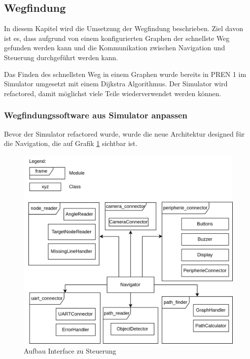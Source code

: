 \subsection{Wegfindung}

In diesem Kapitel wird die Umsetzung der Wegfindung beschrieben. Ziel davon ist es, dass aufgrund von einem konfigurierten Graphen der schnellste Weg gefunden werden kann und die Kommunikation zwischen Navigation und Steuerung durchgeführt werden kann.

Das Finden des schnellsten Weg in einem Graphen wurde bereits in PREN 1 im Simulator umgesetzt mit einem Dijkstra Algorithmus. Der Simulator wird refactored, damit möglichst viele Teile wiederverwendet werden können.

\subsubsection{Wegfindungssoftware aus Simulator anpassen}
\label{navigation-arch}

Bevor der Simulator refactored wurde, wurde die neue Architektur designed für die Navigation, die auf Grafik \ref{fig:nav-arch} sichtbar ist.

\begin{figure}[H]
\centering
\includegraphics[width=\textwidth]{assets/IT/robot-sw-architecture-arch.png}
\caption{Aufbau Interface zu Steuerung}
\label{fig:nav-arch}
\end{figure}


